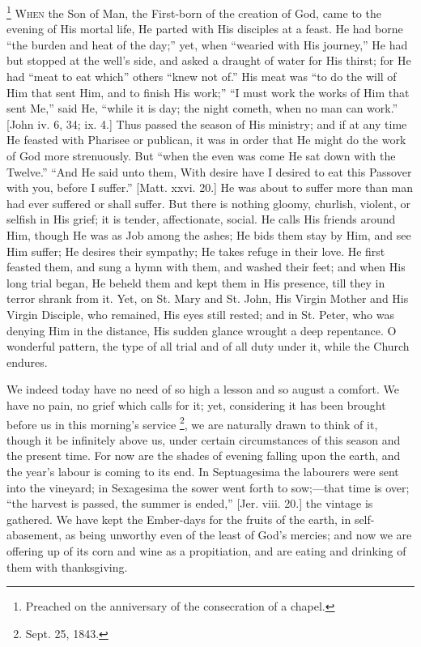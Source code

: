 \footnote{Preached on the anniversary of the consecration of a chapel.} W\textsc{hen} the Son of Man,
the First-born of the creation of God, came to the evening of His
mortal life, He parted with His disciples at a feast. He had borne
``the burden and heat of the day;'' yet, when ``wearied
with His journey,'' He had but stopped at the well's side, and
asked a draught of water for His thirst; for He had ``meat to eat
which'' others ``knew not of.'' His meat was ``to do
the will of Him that sent Him, and to finish His work;'' ``I
must work the works of Him that sent Me,'' said He, ``while it
is day; the night cometh, when no man can work.'' [John iv. 6, 34;
ix. 4.] Thus passed the season of His ministry; and if at any time He
feasted with Pharisee or publican, it was in order that He might do
the work of God more strenuously. But ``when the even was come He
sat down with the Twelve.'' ``And He said unto them, With
desire have I desired to eat this Passover with you, before I
suffer.'' [Matt. xxvi. 20.] He was about to suffer more than man
had ever suffered or shall suffer. But there is nothing gloomy,
churlish, violent, or selfish in His grief; it is tender,
affectionate, social. He calls His friends around Him, though He was
as Job among the ashes; He bids them stay by Him, and see Him suffer;
He desires their sympathy; He takes refuge in their love. He first
feasted them, and sung a hymn with them, and washed their feet; and
when His long trial began, He beheld them and kept them in His
presence, till they in terror shrank from it. Yet, on St. Mary and St.
John, His Virgin Mother and His Virgin Disciple, who remained, His
eyes still rested; and in St. Peter, who was denying Him in the
distance, His sudden glance wrought a deep repentance. O wonderful
pattern, the type of all trial and of all duty under it, while the
Church endures.

We indeed today have no need of so high a lesson and so august a
comfort. We have no pain, no grief which calls for it; yet,
considering it has been brought before us in this morning's service \footnote{Sept. 25, 1843.}, we are naturally drawn to think of it, though it be
infinitely above us, under certain circumstances of this season and
the present time. For now are the shades of evening falling upon the
earth, and the year's labour is coming to its end. In Septuagesima the
labourers were sent into the vineyard; in Sexagesima the sower went
forth to sow;—that time is over; ``the harvest is passed, the
summer is ended,'' [Jer. viii. 20.] the vintage is gathered. We
have kept the Ember-days for the fruits of the earth, in
self-abasement, as being unworthy even of the least of God's mercies;
and now we are offering up of its corn and wine as a propitiation, and
are eating and drinking of them with thanksgiving.

